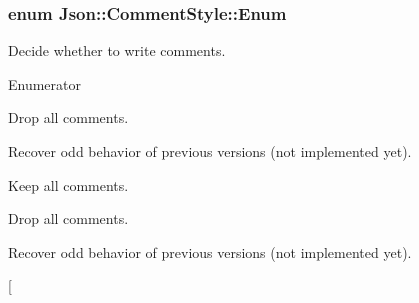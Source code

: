 \subsubsection[{Enum}]{\setlength{\rightskip}{0pt plus 5cm}enum {\bf Json\+::\+Comment\+Style\+::\+Enum}}\label{struct_json_1_1_comment_style_a51fc08f3518fd81eba12f340d19a3d0c}


Decide whether to write comments. 

\begin{Desc}
\item[Enumerator]\par
\begin{description}
\item[{\em 
None\label{struct_json_1_1_comment_style_a51fc08f3518fd81eba12f340d19a3d0ca36399eca8a3b9d995dd8ab0ecb6b5398}
}]Drop all comments. \item[{\em 
Most\label{struct_json_1_1_comment_style_a51fc08f3518fd81eba12f340d19a3d0ca0a9010dbb245e235801402fcc930e3ae}
}]Recover odd behavior of previous versions (not implemented yet). \item[{\em 
All\label{struct_json_1_1_comment_style_a51fc08f3518fd81eba12f340d19a3d0ca23cbf2619e7ca2201259b71212089d6b}
}]Keep all comments. \item[{\em 
None\label{struct_json_1_1_comment_style_a51fc08f3518fd81eba12f340d19a3d0ca36399eca8a3b9d995dd8ab0ecb6b5398}
}]Drop all comments. \item[{\em 
Most\label{struct_json_1_1_comment_style_a51fc08f3518fd81eba12f340d19a3d0ca0a9010dbb245e235801402fcc930e3ae}
}]Recover odd behavior of previous versions (not implemented yet). \item[{\em 
}
\end{description}
\end{Desc}
